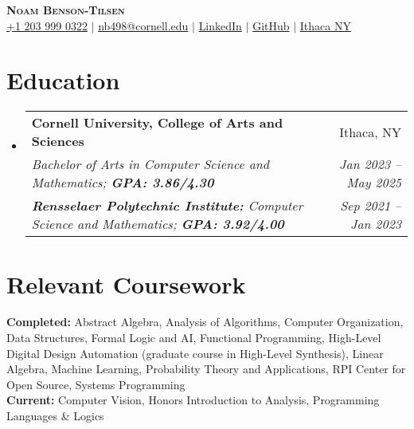 \documentclass[letterpaper,11pt]{article}
\makeatletter
\newcommand{\resumeEducationHeading}[6]{
  \vspace{-2pt}\item
    \begin{tabular*}{0.97\textwidth}[t]{l@{\extracolsep{\fill}}r}
      \textbf{#1} & #2 \\
      \textit{\small#3} & \textit{\small #4} \\
      \textit{\small#5} & \textit{\small #6} \\
    \end{tabular*}\vspace{-5pt}
}
\newcommand{\resumeSubHeadingListStart}{\begin{itemize}[leftmargin=0.15in, label={}]}
\newcommand{\resumeSubHeadingListEnd}{\end{itemize}}
\makeatother
\begin{document}

\begin{center}
    \textbf{\LARGE \scshape Noam Benson-Tilsen} \\ \vspace{1pt}
    \small
    \faMobile \hspace{.5pt} \href{tel:12039990322}{+1 203 999 0322}
    $|$
    \faAt \hspace{.5pt} \href{mailto:nb498@cornell.edu}{nb498@cornell.edu}
    $|$
    \faLinkedinSquare \hspace{.5pt} \href{https://www.linkedin.com/in/Noam-BT}{LinkedIn}
    $|$
    \faGithub \hspace{.5pt} \href{https://github.com/NB-T}{GitHub}
    $|$
    \faMapMarker \hspace{.5pt} \href{https://maps.app.goo.gl/hAsEmk7VTeyA7pVp9}{Ithaca NY}
\end{center}




\section{Education}
  \vspace{1pt}
  \resumeSubHeadingListStart
    
    \resumeEducationHeading
      {Cornell University, College of Arts and Sciences
      }{Ithaca, NY}
      {Bachelor of Arts in Computer Science and Mathematics;   \textbf{GPA: 3.86/4.30}}{Jan 2023 -- May 2025}
      {\textbf{Rensselaer Polytechnic Institute:} Computer Science and Mathematics;
      \textbf{GPA: 3.92/4.00}}{Sep 2021 -- Jan 2023}    
  \resumeSubHeadingListEnd


\section{Relevant Coursework}
\vspace{0.5pt}
\resumeSubHeadingListStart
  \small{\item{
      \textbf{Completed:}{ Abstract Algebra, Analysis of Algorithms, Computer Organization, Data Structures, Formal Logic and AI, Functional Programming, High-Level Digital Design Automation (graduate course in High-Level Synthesis), Linear Algebra, Machine Learning, Probability Theory and Applications, RPI Center for Open Source, Systems Programming } \\ \vspace{1pt}
      \textbf{Current:}{ Computer Vision, Honors Introduction to Analysis, Programming Languages \& Logics }
  }}
\resumeSubHeadingListEnd
\end{document}
